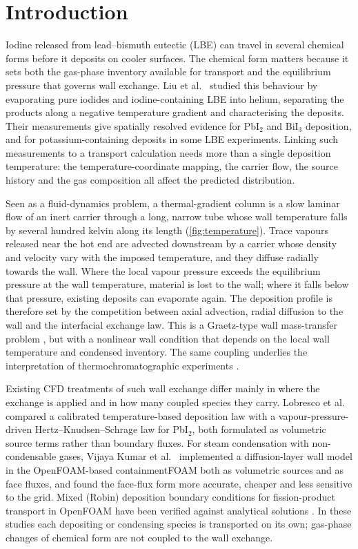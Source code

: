 \section{Introduction}
\label{sec:intro}
Iodine released from lead--bismuth eutectic (LBE) can travel in several
chemical forms before it deposits on cooler surfaces. The chemical form
matters because it sets both the gas-phase inventory available for
transport and the equilibrium pressure that governs wall exchange.
Liu et al.\ \cite{Liu2025chemical} studied this behaviour by evaporating
pure iodides and iodine-containing LBE into helium, separating the
products along a negative temperature gradient and characterising the
deposits. Their measurements give spatially resolved evidence for
PbI$_2$ and BiI$_3$ deposition, and for potassium-containing deposits in
some LBE experiments. Linking such measurements to a transport
calculation needs more than a single deposition temperature: the
temperature-coordinate mapping, the carrier flow, the source history
and the gas composition all affect the predicted distribution.

Seen as a fluid-dynamics problem, a thermal-gradient column is a slow
laminar flow of an inert carrier through a long, narrow tube whose wall
temperature falls by several hundred kelvin along its length
(\cref{fig:temperature}). Trace vapours released near the hot end are
advected downstream by a carrier whose density and velocity vary with
the imposed temperature, and they diffuse radially towards the wall.
Where the local vapour pressure exceeds the equilibrium pressure at the
wall temperature, material is lost to the wall; where it falls below
that pressure, existing deposits can evaporate again. The deposition
profile is therefore set by the competition between axial advection,
radial diffusion to the wall and the interfacial exchange law. This is
a Graetz-type wall mass-transfer problem \cite{Shah1978circular}, but
with a nonlinear wall condition that depends on the local wall
temperature and condensed inventory. The same coupling underlies the
interpretation of thermochromatographic experiments
\cite{Eichler1975verfluchtigung,Zvara1985simulation,Zvara2008inorganic}.

Existing CFD treatments of such wall exchange differ mainly in where the
exchange is applied and in how many coupled species they carry.
Lobresco et al.\ \cite{Lobresco2026assessment} compared a calibrated
temperature-based deposition law with a vapour-pressure-driven
Hertz--Knudsen--Schrage law for PbI$_2$, both formulated as volumetric
source terms rather than boundary fluxes. For steam condensation with
non-condensable gases, Vijaya Kumar et al.\ \cite{VijayaKumar2021implementation}
implemented a diffusion-layer wall model in the OpenFOAM-based
containmentFOAM both as volumetric sources and as face fluxes, and found
the face-flux form more accurate, cheaper and less sensitive to the
grid. Mixed (Robin) deposition boundary conditions for fission-product
transport in OpenFOAM have been verified against analytical solutions
\cite{DiRonco2021eulerian}. In these studies each depositing or
condensing species is transported on its own; gas-phase changes of
chemical form are not coupled to the wall exchange.

